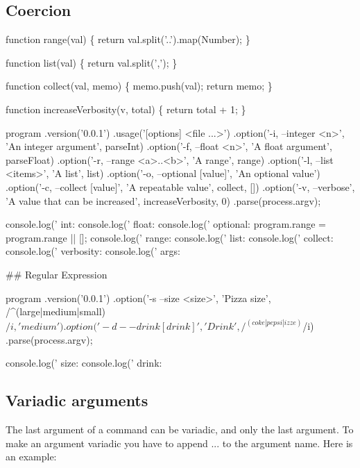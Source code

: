 \subsection*{Coercion}


\begin{DoxyCode}
function range(val) \{
  return val.split('..').map(Number);
\}

function list(val) \{
  return val.split(',');
\}

function collect(val, memo) \{
  memo.push(val);
  return memo;
\}

function increaseVerbosity(v, total) \{
  return total + 1;
\}

program
  .version('0.0.1')
  .usage('[options] <file ...>')
  .option('-i, --integer <n>', 'An integer argument', parseInt)
  .option('-f, --float <n>', 'A float argument', parseFloat)
  .option('-r, --range <a>..<b>', 'A range', range)
  .option('-l, --list <items>', 'A list', list)
  .option('-o, --optional [value]', 'An optional value')
  .option('-c, --collect [value]', 'A repeatable value', collect, [])
  .option('-v, --verbose', 'A value that can be increased', increaseVerbosity, 0)
  .parse(process.argv);

console.log(' int: %
console.log(' float: %
console.log(' optional: %
program.range = program.range || [];
console.log(' range: %
console.log(' list: %
console.log(' collect: %
console.log(' verbosity: %
console.log(' args: %
\end{DoxyCode}


\#\# Regular Expression 
\begin{DoxyCode}
program
  .version('0.0.1')
  .option('-s --size <size>', 'Pizza size', /^(large|medium|small)$/i, 'medium')
  .option('-d --drink [drink]', 'Drink', /^(coke|pepsi|izze)$/i)
  .parse(process.argv);

console.log(' size: %
console.log(' drink: %
\end{DoxyCode}


\subsection*{Variadic arguments}

The last argument of a command can be variadic, and only the last argument. To make an argument variadic you have to append {\ttfamily ...} to the argument name. Here is an example\+:


